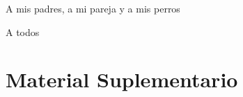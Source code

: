 \documentclass[upright, contnum]{umemoria}
\begin{document}
\begin{dedicatoria} %
A mis padres, a mi pareja y a mis perros
\end{dedicatoria}

\begin{thanks} %
A todos
\end{thanks}
\cleardoublepage

\tableofcontents
\listoftables %
\listoffigures %

\mainmatter



%






\appendix
\chapter{Material Suplementario}
\end{document}
